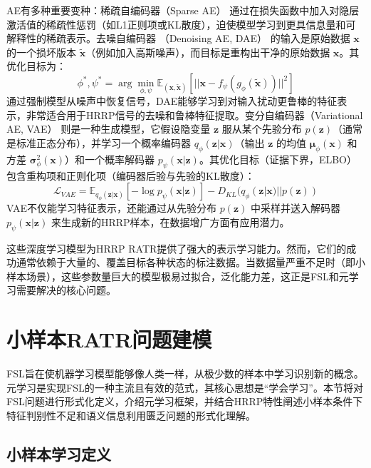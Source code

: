 AE有多种重要变种：稀疏自编码器（Sparse AE） 通过在损失函数中加入对隐层激活值的稀疏性惩罚（如L1正则项或KL散度），迫使模型学习到更具信息量和可解释性的稀疏表示。去噪自编码器 （Denoising AE, DAE） 的输入是原始数据 $\mathbf{x}$ 的一个损坏版本 $\tilde{\mathbf{x}}$（例如加入高斯噪声），而目标是重构出干净的原始数据 $\mathbf{x}$。其优化目标为：
\begin{equation}
    \phi^*, \psi^* = \arg\min_{\phi, \psi} \mathbb{E}_{(\mathbf{x}, \tilde{\mathbf{x}})} [ ||\mathbf{x} - f_\psi(g_\phi(\tilde{\mathbf{x}}))||^2 ]
    \label{eq:dae_objective}
\end{equation}
通过强制模型从噪声中恢复信号，DAE能够学习到对输入扰动更鲁棒的特征表示，非常适合用于HRRP信号的去噪和鲁棒特征提取。变分自编码器（Variational AE, VAE） 则是一种生成模型，它假设隐变量 $\mathbf{z}$ 服从某个先验分布 $p(\mathbf{z})$（通常是标准正态分布），并学习一个概率编码器 $q_\phi(\mathbf{z}|\mathbf{x})$（输出 $\mathbf{z}$ 的均值 $\boldsymbol{\mu}_\phi(\mathbf{x})$ 和方差 $\boldsymbol{\sigma}^2_\phi(\mathbf{x})$）和一个概率解码器 $p_\psi(\mathbf{x}|\mathbf{z})$。其优化目标（证据下界，ELBO）包含重构项和正则化项（编码器后验与先验的KL散度）：
\begin{equation}
    \mathcal{L}_{VAE} = \mathbb{E}_{q_\phi(\mathbf{z}|\mathbf{x})}[-\log p_\psi(\mathbf{x}|\mathbf{z})] - D_{KL}(q_\phi(\mathbf{z}|\mathbf{x}) || p(\mathbf{z}))
    \label{eq:vae_objective}
\end{equation}
VAE不仅能学习特征表示，还能通过从先验分布 $p(\mathbf{z})$ 中采样并送入解码器 $p_\psi(\mathbf{x}|\mathbf{z})$ 来生成新的HRRP样本，在数据增广方面有应用潜力。

这些深度学习模型为HRRP RATR提供了强大的表示学习能力。然而，它们的成功通常依赖于大量的、覆盖目标各种状态的标注数据。当数据量严重不足时（即小样本场景），这些参数量巨大的模型极易过拟合，泛化能力差，这正是FSL和元学习需要解决的核心问题。
\section{小样本RATR问题建模}
\label{sec:fsl_modeling}

FSL旨在使机器学习模型能够像人类一样，从极少数的样本中学习识别新的概念。元学习是实现FSL的一种主流且有效的范式，其核心思想是“学会学习”。本节将对FSL问题进行形式化定义，介绍元学习框架，并结合HRRP特性阐述小样本条件下特征判别性不足和语义信息利用匮乏问题的形式化理解。

\subsection{小样本学习定义}
\label{subsec:fsl_definition}

